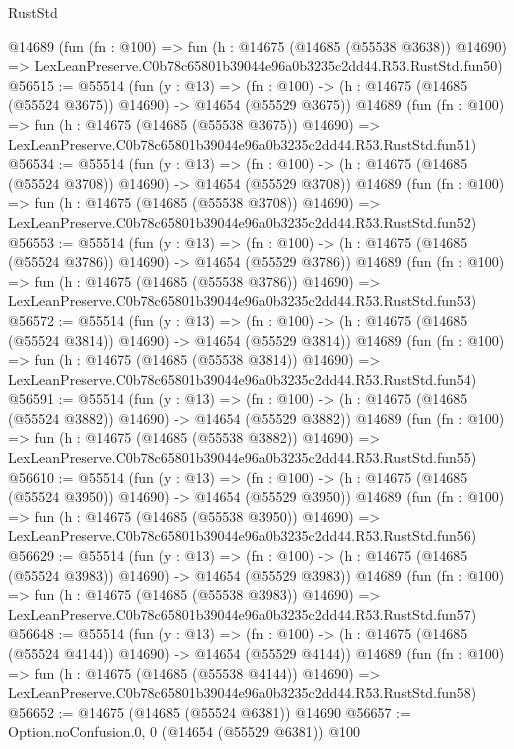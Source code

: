 \begin{lexlean}{RustStd}
\begin{coremodule}
    @14689
    (fun (fn : @100) =>
    fun (h : @14675 (@14685 (@55538 @3638)) @14690) =>
    LexLeanPreserve.C0b78c65801b39044e96a0b3235c2dd44.R53.RustStd.fun50)
@56515 := @55514
    (fun (y : @13) =>
    (fn : @100) -> (h : @14675 (@14685 (@55524 @3675)) @14690) -> @14654 (@55529 @3675))
    @14689
    (fun (fn : @100) =>
    fun (h : @14675 (@14685 (@55538 @3675)) @14690) =>
    LexLeanPreserve.C0b78c65801b39044e96a0b3235c2dd44.R53.RustStd.fun51)
@56534 := @55514
    (fun (y : @13) =>
    (fn : @100) -> (h : @14675 (@14685 (@55524 @3708)) @14690) -> @14654 (@55529 @3708))
    @14689
    (fun (fn : @100) =>
    fun (h : @14675 (@14685 (@55538 @3708)) @14690) =>
    LexLeanPreserve.C0b78c65801b39044e96a0b3235c2dd44.R53.RustStd.fun52)
@56553 := @55514
    (fun (y : @13) =>
    (fn : @100) -> (h : @14675 (@14685 (@55524 @3786)) @14690) -> @14654 (@55529 @3786))
    @14689
    (fun (fn : @100) =>
    fun (h : @14675 (@14685 (@55538 @3786)) @14690) =>
    LexLeanPreserve.C0b78c65801b39044e96a0b3235c2dd44.R53.RustStd.fun53)
@56572 := @55514
    (fun (y : @13) =>
    (fn : @100) -> (h : @14675 (@14685 (@55524 @3814)) @14690) -> @14654 (@55529 @3814))
    @14689
    (fun (fn : @100) =>
    fun (h : @14675 (@14685 (@55538 @3814)) @14690) =>
    LexLeanPreserve.C0b78c65801b39044e96a0b3235c2dd44.R53.RustStd.fun54)
@56591 := @55514
    (fun (y : @13) =>
    (fn : @100) -> (h : @14675 (@14685 (@55524 @3882)) @14690) -> @14654 (@55529 @3882))
    @14689
    (fun (fn : @100) =>
    fun (h : @14675 (@14685 (@55538 @3882)) @14690) =>
    LexLeanPreserve.C0b78c65801b39044e96a0b3235c2dd44.R53.RustStd.fun55)
@56610 := @55514
    (fun (y : @13) =>
    (fn : @100) -> (h : @14675 (@14685 (@55524 @3950)) @14690) -> @14654 (@55529 @3950))
    @14689
    (fun (fn : @100) =>
    fun (h : @14675 (@14685 (@55538 @3950)) @14690) =>
    LexLeanPreserve.C0b78c65801b39044e96a0b3235c2dd44.R53.RustStd.fun56)
@56629 := @55514
    (fun (y : @13) =>
    (fn : @100) -> (h : @14675 (@14685 (@55524 @3983)) @14690) -> @14654 (@55529 @3983))
    @14689
    (fun (fn : @100) =>
    fun (h : @14675 (@14685 (@55538 @3983)) @14690) =>
    LexLeanPreserve.C0b78c65801b39044e96a0b3235c2dd44.R53.RustStd.fun57)
@56648 := @55514
    (fun (y : @13) =>
    (fn : @100) -> (h : @14675 (@14685 (@55524 @4144)) @14690) -> @14654 (@55529 @4144))
    @14689
    (fun (fn : @100) =>
    fun (h : @14675 (@14685 (@55538 @4144)) @14690) =>
    LexLeanPreserve.C0b78c65801b39044e96a0b3235c2dd44.R53.RustStd.fun58)
@56652 := @14675 (@14685 (@55524 @6381)) @14690
@56657 := Option.noConfusion.{0, 0} (@14654 (@55529 @6381)) @100

\end{coremodule}
\end{lexlean}
